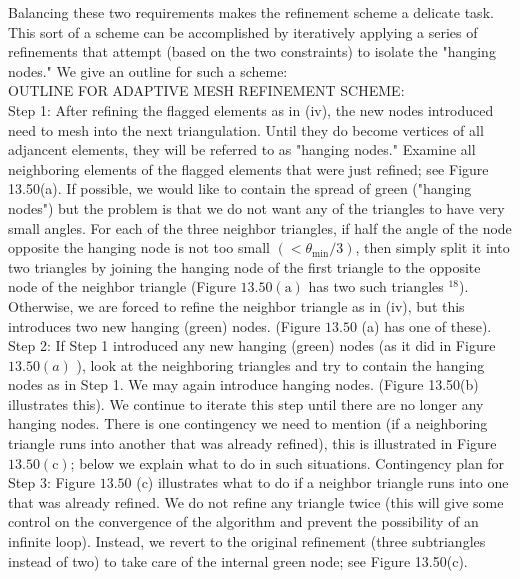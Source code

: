 \documentclass[../main.tex]{subfiles}
\begin{document}
\begin{enumerate}
Balancing these two requirements makes the refinement scheme a delicate task. This sort of a scheme can be accomplished by iteratively applying a series of refinements that attempt (based on the two constraints) to isolate the "hanging nodes." We give an outline for such a scheme:
\\
OUTLINE FOR ADAPTIVE MESH REFINEMENT SCHEME:\\
Step 1: After refining the flagged elements as in (iv), the new nodes introduced need to mesh into the next triangulation. Until they do become vertices of all adjancent elements, they will be referred to as "hanging nodes." Examine all neighboring elements of the flagged elements that were just refined; see Figure 13.50(a). If possible, we would like to contain the spread of green ("hanging nodes") but the problem is that we do not want any of the triangles to have very small angles. For each of the three neighbor triangles, if half the angle of the node opposite the hanging node is not too small $\left(<\theta_{\min } / 3\right)$, then simply split it into two triangles by joining the hanging node of the first triangle to the opposite node of the neighbor triangle (Figure $13.50(\mathrm{a})$ has two such triangles ${ }^{18}$). Otherwise, we are forced to refine the neighbor triangle as in (iv), but this introduces two new hanging (green) nodes. (Figure $13.50$ (a) has one of these).\\
Step 2: If Step 1 introduced any new hanging (green) nodes (as it did in Figure $13.50(a)$ ), look at the neighboring triangles and try to contain the hanging nodes as in Step 1. We may again introduce hanging nodes. (Figure 13.50(b) illustrates this). We continue to iterate this step until there are no longer any hanging nodes. There is one contingency we need to mention (if a neighboring triangle runs into another that was already refined), this is illustrated in Figure $13.50(\mathrm{c})$; below we explain what to do in such situations.
Contingency plan for Step 3: Figure $13.50$ (c) illustrates what to do if a neighbor triangle runs into one that was already refined. We do not refine any triangle twice (this will give some control on the convergence of the algorithm and prevent the possibility of an infinite loop). Instead, we revert to the original refinement (three subtriangles instead of two) to take care of the internal green node; see Figure 13.50(c).\\

\end{enumerate}
\end{document}
